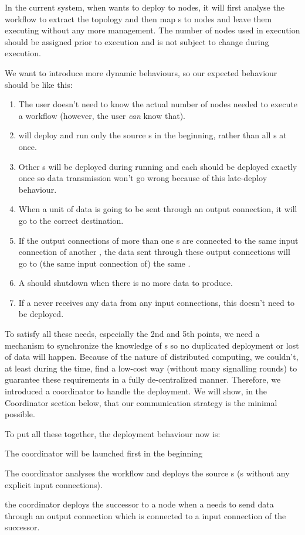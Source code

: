 In the current \dpy system, when \dpy wants to deploy \tPEInst to nodes, it will first analyse the workflow to extract the topology and then map \tPEInst{}s to nodes and leave them executing without any more management. The number of nodes used in execution should be assigned prior to execution and is not subject to change during execution.

We want to introduce more dynamic behaviours, so our expected behaviour should be like this:
\begin{enumerate}
	\item The user doesn't need to know the actual number of nodes needed to execute a workflow (however, the user \emph{can} know that).
	\item \Dpy will deploy and run only the source \tPEInst{}s in the beginning, rather than all \tPEInst{}s at once.
	\item Other \tPEInst{}s will be deployed during running and each \tPEInst should be deployed exactly once so data transmission won't go wrong because of this late-deploy behaviour.
	\item When a unit of data is going to be sent through an output connection, it will go to the correct destination.
	\item If the output connections of more than one \tPEInst{}s are connected to the same input connection of another \tPEInst, the data sent through these output connections will go to (the same input connection of) the same \tPEInst.
	\item A \tPEInst should shutdown when there is no more data to produce.
	\item If a \tPEInst never receives any data from any input connections, this \tPEInst doesn't need to be deployed.
\end{enumerate}

To satisfy all these needs, especially the 2nd and 5th points, we need a mechanism to synchronize the knowledge of \tPEInst{}s so no duplicated deployment or lost of data will happen. Because of the nature of distributed computing, we couldn't, at least during the time, find a low-cost way (\ie without many signalling rounds) to guarantee these requirements in a fully de-centralized manner. Therefore, we introduced a coordinator to handle the deployment. We will show, in the Coordinator section below, that our communication strategy is the minimal possible.

To put all these together, the deployment behaviour now is:
\begin{enumerate*}
	\item The coordinator will be launched first in the beginning
	\item The coordinator analyses the workflow and deploys the source \tPEInst{}s (\ie \tPEInst{}s without any explicit input connections).
	\item the coordinator deploys the successor \tPEInst to a node when a \tPEInst needs to send data through an output connection which is connected to a input connection of the successor.
\end{enumerate*}

